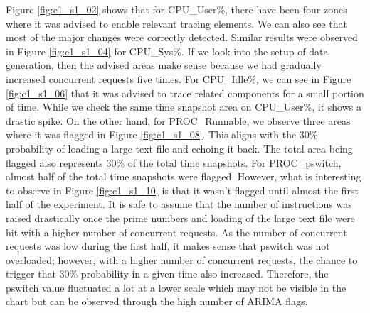 \documentclass[pdflatex,sn-nature]{sn-jnl}%
\theoremstyle{thmstyleone}%
\theoremstyle{thmstyletwo}%
\theoremstyle{thmstylethree}%
\begin{document}
Figure \ref{fig:c1_s1_02} shows that for CPU\_User\%, there have been four zones where it was advised to enable relevant tracing elements. We can also see that most of the major changes were correctly detected. Similar results were observed in Figure \ref{fig:c1_s1_04} for CPU\_Sys\%. If we look into the setup of data generation, then the advised areas make sense because we had gradually increased concurrent requests five times. For CPU\_Idle\%, we can see in Figure \ref{fig:c1_s1_06} that it was advised to trace related components for a small portion of time. While we check the same time snapshot area on CPU\_User\%, it shows a drastic spike.
On the other hand, for PROC\_Runnable, we observe three areas where it was flagged in Figure \ref{fig:c1_s1_08}. This aligns with the 30\% probability of loading a large text file and echoing it back. The total area being flagged also represents 30\% of the total time snapshots. For PROC\_pswitch, almost half of the total time snapshots were flagged. However, what is interesting to observe in Figure \ref{fig:c1_s1_10} is that it wasn't flagged until almost the first half of the experiment. It is safe to assume that the number of instructions was raised drastically once the prime numbers and loading of the large text file were hit with a higher number of concurrent requests. As the number of concurrent requests was low during the first half, it makes sense that pswitch was not overloaded; however, with a higher number of concurrent requests, the chance to trigger that 30\% probability in a given time also increased. Therefore, the pswitch value fluctuated a lot at a lower scale which may not be visible in the chart but can be observed through the high number of ARIMA flags.
\end{document}
